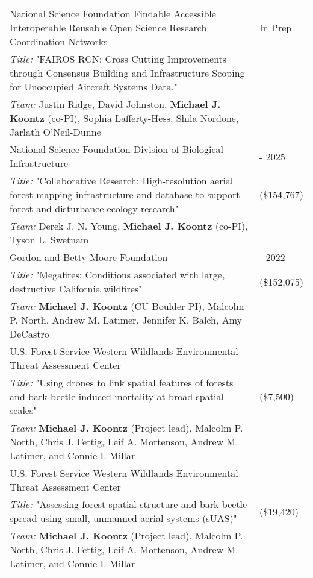\begin{longtable}{@{}>{\raggedright}p{5.25in} @{} >{\raggedleft}X@{}}

National Science Foundation Findable Accessible Interoperable Reusable Open Science Research Coordination Networks & In Prep \tabularnewline
\addtolength{\leftskip}{5ex}\emph{Title:} "FAIROS RCN: Cross Cutting Improvements through Consensus Building and Infrastructure Scoping for Unoccupied Aircraft Systems Data." & \tabularnewline
\addtolength{\leftskip}{5ex}\emph{Team:} Justin Ridge, David Johnston, \textbf{Michael J. Koontz} (co-PI), Sophia Lafferty-Hess, Shila Nordone, Jarlath O'Neil-Dunne &\tabularnewline

National Science Foundation Division of Biological Infrastructure & 2022 - 2025 \tabularnewline
\addtolength{\leftskip}{5ex}\emph{Title:} "Collaborative Research: High-resolution aerial forest mapping infrastructure and database to support forest and disturbance ecology research" & (\$154,767) \tabularnewline
\addtolength{\leftskip}{5ex}\emph{Team:} Derek J. N. Young, \textbf{Michael J. Koontz} (co-PI), Tyson L. Swetnam & \tabularnewline

Gordon and Betty Moore Foundation & 2020 - 2022 \tabularnewline
\addtolength{\leftskip}{5ex}\emph{Title:} "Megafires: Conditions associated with large, destructive California wildfires" & (\$152,075) \tabularnewline
\addtolength{\leftskip}{5ex}\emph{Team:} \textbf{Michael J. Koontz} (CU Boulder PI), Malcolm P. North, Andrew M. Latimer, Jennifer K. Balch, Amy DeCastro & \tabularnewline

U.S. Forest Service Western Wildlands Environmental Threat Assessment Center & 2018 \tabularnewline
\addtolength{\leftskip}{5ex}\emph{Title:} "Using drones to link spatial features of forests and bark beetle-induced mortality at broad spatial scales" & (\$7,500) \tabularnewline
\addtolength{\leftskip}{5ex}\emph{Team:} \textbf{Michael J. Koontz} (Project lead), Malcolm P. North, Chris J. Fettig, Leif A. Mortenson, Andrew M. Latimer, and Connie I. Millar & \tabularnewline

U.S. Forest Service Western Wildlands Environmental Threat Assessment Center & 2017 \tabularnewline
\addtolength{\leftskip}{5ex}\emph{Title:} "Assessing forest spatial structure and bark beetle spread using small, unmanned aerial systems (sUAS)" & (\$19,420) \tabularnewline
\addtolength{\leftskip}{5ex}\emph{Team:} \textbf{Michael J. Koontz} (Project lead), Malcolm P. North, Chris J. Fettig, Leif A. Mortenson, Andrew M. Latimer, and Connie I. Millar & \tabularnewline

\end{longtable}
